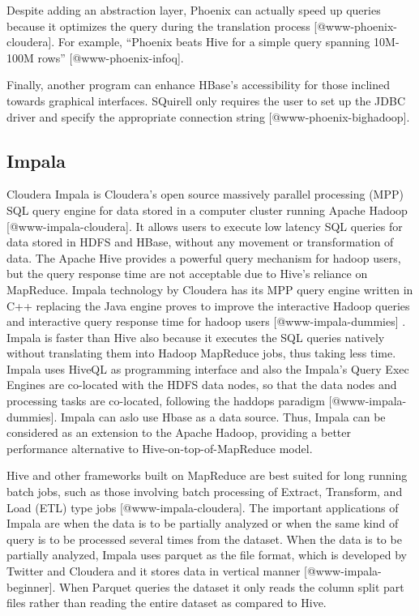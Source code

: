 Despite adding an abstraction layer, Phoenix can actually speed up
queries because it optimizes the query during the translation
process [@www-phoenix-cloudera]. For example, ``Phoenix beats Hive
for a simple query spanning 10M-100M rows'' [@www-phoenix-infoq].

Finally, another program can enhance HBase's accessibility for those
inclined towards graphical interfaces.  SQuirell only requires the
user to set up the JDBC driver and specify the appropriate connection
string [@www-phoenix-bighadoop].



\subsection{Impala}

Cloudera Impala is Cloudera's open source massively parallel
processing (MPP) SQL query engine for data stored in a computer
cluster running Apache Hadoop [@www-impala-cloudera]. It allows
users to execute low latency SQL queries for data stored in HDFS and
HBase, without any movement or transformation of data. The Apache Hive
provides a powerful query mechanism for hadoop users, but the query
response time are not acceptable due to Hive's reliance on
MapReduce. Impala technology by Cloudera has its MPP query engine
written in C++ replacing the Java engine proves to improve the
interactive Hadoop queries and interactive query response time for
hadoop users [@www-impala-dummies] . Impala is faster than Hive
also because it executes the SQL queries natively without translating
them into Hadoop MapReduce jobs, thus taking less time. Impala uses
HiveQL as programming interface and also the Impala's Query Exec
Engines are co-located with the HDFS data nodes, so that the data
nodes and processing tasks are co-located, following the haddops
paradigm [@www-impala-dummies].  Impala can aslo use Hbase as a
data source. Thus, Impala can be considered as an extension to the
Apache Hadoop, providing a better performance alternative to
Hive-on-top-of-MapReduce model.

Hive and other frameworks built on MapReduce are best suited for long
running batch jobs, such as those involving batch processing of
Extract, Transform, and Load (ETL) type
jobs [@www-impala-cloudera].  The important applications of Impala
are when the data is to be partially analyzed or when the same kind of
query is to be processed several times from the dataset. When the data
is to be partially analyzed, Impala uses parquet as the file format,
which is developed by Twitter and Cloudera and it stores data in
vertical manner [@www-impala-beginner]. When Parquet queries the
dataset it only reads the column split part files rather than reading
the entire dataset as compared to Hive.
     

